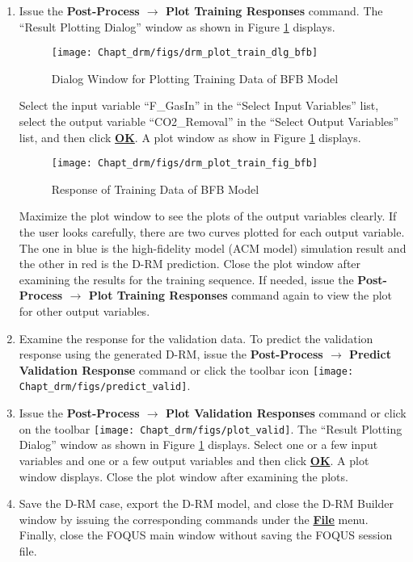 \begin{enumerate}
	\item Issue the \textbf{Post-Process $\rightarrow$ Plot Training Responses} command.  The ``Result Plotting Dialog'' window as shown in Figure \ref{fig.drm_plot_train_dlg_bfb} displays.
	\begin{figure}[H]
		\begin{center}
			\texttt{[image: Chapt\_drm/figs/drm\_plot\_train\_dlg\_bfb]}
			\caption{Dialog Window for Plotting Training Data of BFB Model}
			\label{fig.drm_plot_train_dlg_bfb}
		\end{center}
	\end{figure}
	Select the input variable ``F\_GasIn'' in the ``Select Input Variables'' list, select the output variable ``CO2\_Removal'' in the ``Select Output Variables'' list, and then click \textbf{\underline{OK}}.  A plot window as show in Figure \ref{fig.drm_plot_train_dlg_bfb} displays.
	\begin{figure}[H]
		\begin{center}
			\texttt{[image: Chapt\_drm/figs/drm\_plot\_train\_fig\_bfb]}
			\caption{Response of Training Data of BFB Model}
			\label{fig.drm_plot_train_fig_bfb}
		\end{center}
	\end{figure}
	Maximize the plot window to see the plots of the output variables clearly.  If the user looks carefully, there are two curves plotted for each output variable.  The one in blue is the high-fidelity model (ACM model) simulation result and the other in red is the D-RM prediction.  Close the plot window after examining the results for the training sequence.  If needed, issue the \textbf{Post-Process $\rightarrow$ Plot Training Responses} command again to view the plot for other output variables.
	\item Examine the response for the validation data.  To predict the validation response using the generated D-RM, issue the \textbf{Post-Process $\rightarrow$ Predict Validation Response} command or click the toolbar icon \texttt{[image: Chapt\_drm/figs/predict\_valid]}.
	\item Issue the \textbf{Post-Process $\rightarrow$ Plot Validation Responses} command or click on the toolbar \texttt{[image: Chapt\_drm/figs/plot\_valid]}.  The ``Result Plotting Dialog'' window as shown in Figure \ref{fig.drm_plot_train_dlg_bfb} displays.  Select one or a few input variables and one or a few output variables and then click \textbf{\underline{OK}}.  A plot window displays.  Close the plot window after examining the plots.
	\item Save the D-RM case, export the D-RM model, and close the D-RM Builder window by issuing the corresponding commands under the \textbf{\underline{File}} menu.  Finally, close the FOQUS main window without saving the FOQUS session file.
\end{enumerate}

